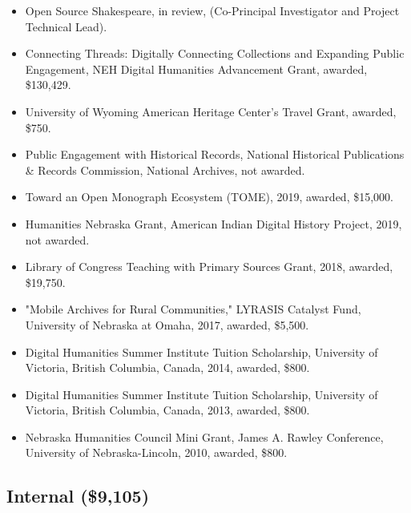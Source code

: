 \documentclass[10pt]{article}
\begin{document}
\begin{itemize}
  \item Open Source Shakespeare, in review, (Co-Principal Investigator and Project Technical Lead).
  \item Connecting Threads: Digitally Connecting Collections and Expanding Public Engagement, NEH Digital Humanities Advancement Grant, awarded, \$130,429.
  \item University of Wyoming American Heritage Center's Travel Grant, awarded, \$750.
  \item Public Engagement with Historical Records, National Historical Publications \& Records Commission, National Archives, not awarded.
  \item Toward an Open Monograph Ecosystem (TOME), 2019, awarded, \$15,000.
  \item Humanities Nebraska Grant, American Indian Digital History Project, 2019, not awarded.
  \item Library of Congress Teaching with Primary Sources Grant, 2018, awarded, \$19,750.
  \item "Mobile Archives for Rural Communities," LYRASIS Catalyst Fund, University of Nebraska at Omaha, 2017, awarded, \$5,500.
  \item Digital Humanities Summer Institute Tuition Scholarship, University of Victoria, British Columbia, Canada, 2014, awarded, \$800.
  \item Digital Humanities Summer Institute Tuition Scholarship, University of Victoria, British Columbia, Canada, 2013, awarded, \$800.
  \item Nebraska Humanities Council Mini Grant, James A. Rawley Conference, University of Nebraska-Lincoln, 2010, awarded, \$800.
\end{itemize}

\subsection*{Internal (\$9,105)}
\end{document}
